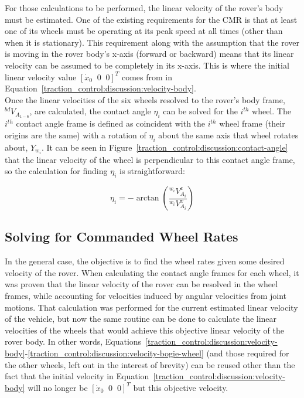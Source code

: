 For those calculations to be performed, the linear velocity of the rover's body must be estimated. One of the existing requirements for the \ac{CMR} is that at least one of its wheels must be operating at its peak speed at all times (other than when it is stationary). This requirement along with the assumption that the rover is moving in the rover body's x-axis (forward or backward) means that its linear velocity can be assumed to be completely in its x-axis. This is where the initial linear velocity value $\left[\dot{x}_0 \;\; 0 \;\; 0\right]^{T}$ comes from in Equation~\ref{traction_control:discussion:velocity-body}. \\

Once the linear velocities of the six wheels resolved to the rover's body frame, ${}^{bd}V_{A_{1-6}}$, are calculated, the contact angle $\eta_{i}$ can be solved for the $i^{th}$ wheel. The $i^{th}$ contact angle frame is defined as coincident with the $i^{th}$ wheel frame (their origins are the same) with a rotation of $\eta_{i}$ about the same axis that wheel rotates about, $Y_{w_{i}}$. It can be seen in Figure~\ref{traction_control:discussion:contact-angle} that the linear velocity of the wheel is perpendicular to this contact angle frame, so the calculation for finding $\eta_{i}$ is straightforward:

\begin{equation}\label{traction_control:discussion:contact-angle-i}
	\eta_{i} = -\arctan\left(\frac{{}^{w_{i}}V^{z}_{A_{i}}}{{}^{w_{i}}V^{x}_{A_{i}}}\right)
\end{equation}

\subsection{Solving for Commanded Wheel Rates}\label{traction_control:discussion:solving-wheel-rates}
In the general case, the objective is to find the wheel rates given some desired velocity of the rover. When calculating the contact angle frames for each wheel, it was proven that the linear velocity of the rover can be resolved in the wheel frames, while accounting for velocities induced by angular velocities from joint motions. That calculation was performed for the current estimated linear velocity of the vehicle, but now the same routine can be done to calculate the linear velocities of the wheels that would achieve this objective linear velocity of the rover body. In other words, Equations~\ref{traction_control:discussion:velocity-body}-\ref{traction_control:discussion:velocity-bogie-wheel} (and those required for the other wheels, left out in the interest of brevity) can be reused other than the fact that the initial velocity in Equation~\ref{traction_control:discussion:velocity-body} will no longer be $\left[\dot{x}_0 \;\; 0 \;\; 0\right]^{T}$ but this objective velocity. \\

